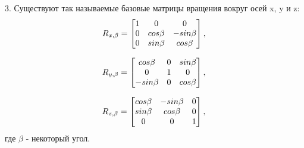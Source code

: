 3. Существуют так называемые базовые матрицы вращения вокруг осей x, y и z:
\begin{equation*}\label{eq:model}
R_{x, \beta} = 
     \begin{bmatrix}
    1 & 0 & 0\\
    0 & cos\beta & -sin\beta\\
    0 & sin\beta & cos\beta\\
    \end{bmatrix}
    , \\
\end{equation*} 

\begin{equation*}\label{eq:model}
R_{y, \beta} = 
     \begin{bmatrix}
    cos\beta & 0 & sin\beta\\
    0 & 1 & 0\\
    -sin\beta & 0 & cos\beta\\
    \end{bmatrix}
    , \\
\end{equation*} 

\begin{equation*}\label{eq:model}
R_{z, \beta} = 
     \begin{bmatrix}
   
    cos\beta & -sin\beta & 0\\
    sin\beta & cos\beta & 0\\
    0 & 0 & 1\\
    \end{bmatrix}
    , \\
\end{equation*} 
где $\beta$ - некоторый угол.\\

